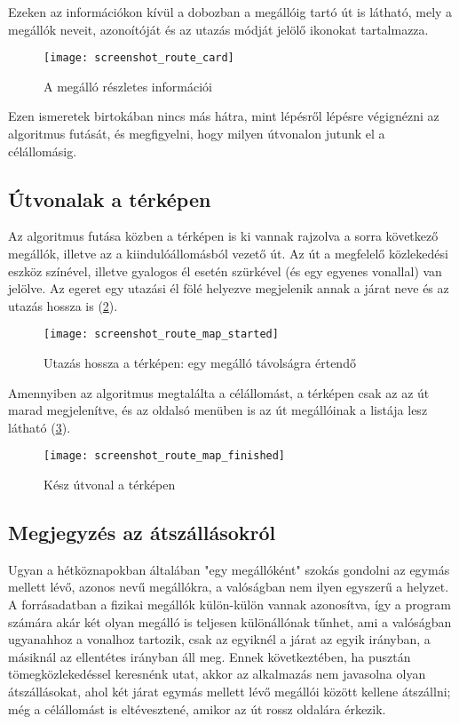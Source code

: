 Ezeken az információkon kívül a dobozban a megállóig tartó út is látható, mely a megállók neveit, azonoítóját és az utazás módját jelölő ikonokat tartalmazza.

\begin{figure}[H]
	\centering
	\texttt{[image: screenshot\_route\_card]}
	\caption{A megálló részletes információi}
	\label{fig:screenshot-route-card}
\end{figure}

Ezen ismeretek birtokában nincs más hátra, mint lépésről lépésre végignézni az algoritmus futását, és megfigyelni, hogy milyen útvonalon jutunk el a célállomásig.

\subsection{Útvonalak a térképen}

Az algoritmus futása közben a térképen is ki vannak rajzolva a sorra következő megállók, illetve az a kiindulóállomásból vezető út. Az út a megfelelő közlekedési eszköz színével, illetve gyalogos él esetén szürkével (és egy egyenes vonallal) van jelölve. Az egeret egy utazási él fölé helyezve megjelenik annak a járat neve és az utazás hossza is (\ref{fig:screenshot-route-map-started}).

\begin{figure}[H]
	\centering
	\texttt{[image: screenshot\_route\_map\_started]}
	\caption{Utazás hossza a térképen: egy megálló távolságra értendő}
	\label{fig:screenshot-route-map-started}
\end{figure}

Amennyiben az algoritmus megtalálta a célállomást, a térképen csak az az út marad megjelenítve, és az oldalsó menüben is az út megállóinak a listája lesz látható (\ref{fig:screenshot-route-map-finished}).

\begin{figure}[H]
	\centering
	\texttt{[image: screenshot\_route\_map\_finished]}
	\caption{Kész útvonal a térképen}
	\label{fig:screenshot-route-map-finished}
\end{figure}

\subsection{Megjegyzés az átszállásokról}

Ugyan a hétköznapokban általában "egy megállóként" szokás gondolni az egymás mellett lévő, azonos nevű megállókra, a valóságban nem ilyen egyszerű a helyzet. A forrásadatban a fizikai megállók külön-külön vannak azonosítva, így a program számára akár két olyan megálló is teljesen különállónak tűnhet, ami a valóságban ugyanahhoz a vonalhoz tartozik, csak az egyiknél a járat az egyik irányban, a másiknál az ellentétes irányban áll meg. Ennek következtében, ha pusztán tömegközlekedéssel keresnénk utat, akkor az alkalmazás nem javasolna olyan átszállásokat, ahol két járat egymás mellett lévő megállói között kellene átszállni; még a célállomást is eltévesztené, amikor az út rossz oldalára érkezik.

